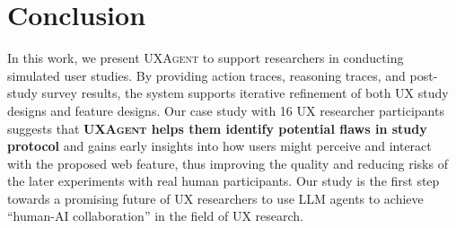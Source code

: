 \documentclass[manuscript,review,anonymous]{acmart}
\DeclareRobustCommand{\projectname}{\textsc{UXAgent}\xspace}
\DeclareRobustCommand{\note}[1]{{\sethlcolor{orange!30!white}\hl{#1}}}
\begin{document}
\section{Conclusion}

In this work, we present \projectname to support researchers in conducting simulated user studies.
By providing action traces, reasoning traces, and post-study survey results, the system supports iterative refinement of both UX study designs and feature designs.
Our case study with 16 UX researcher participants suggests that \textbf{\projectname helps them identify potential flaws in study protocol } and gains early insights into how users might perceive and interact with the proposed web feature, thus improving the quality and reducing risks of the later experiments with real human participants.
Our study is the first step towards a promising future of UX researchers to use LLM agents to achieve ``human-AI collaboration'' in the field of UX research.






\clearpage
\appendix
\end{document}
